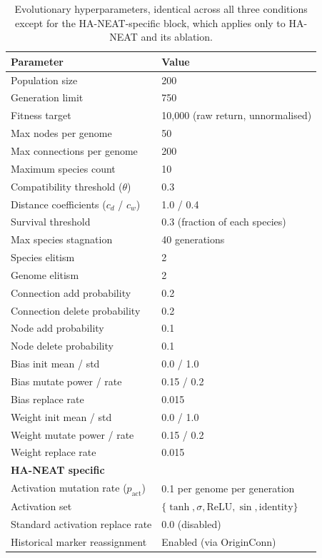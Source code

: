 \documentclass[12pt]{article}
\newcommand{\revTerm}[2]{#2}
\newcommand{\revFig}[2]{#2}
\begin{document}
\begin{table}[h]
\centering
\caption{\revFig{F-06b}{Evolutionary hyperparameters, identical across all three conditions except for the HA-NEAT-specific block, which applies only to HA-NEAT and its ablation.}}
\label{tab:hyperparameters}
\begin{tabular}{ll}
\toprule
\textbf{Parameter} & \textbf{Value} \\
\midrule
Population size & 200 \\
Generation limit & 750 \\
\revFig{F-07}{Fitness target} & 10{,}000 (raw return, unnormalised) \\
Max nodes per genome & 50 \\
Max connections per genome & 200 \\
Maximum species count & 10 \\
Compatibility threshold ($\theta$) & 0.3 \\
Distance coefficients ($c_d$ / $c_w$) & 1.0 / 0.4 \\
Survival threshold & 0.3 (fraction of each species) \\
Max species stagnation & 40 generations \\
Species elitism & 2 \\
Genome elitism & 2 \\
Connection add probability & 0.2 \\
Connection delete probability & 0.2 \\
Node add probability & 0.1 \\
Node delete probability & 0.1 \\
Bias init mean / std & 0.0 / 1.0 \\
Bias mutate power / rate & 0.15 / 0.2 \\
Bias replace rate & 0.015 \\
Weight init mean / std & 0.0 / 1.0 \\
Weight mutate power / rate & 0.15 / 0.2 \\
Weight replace rate & 0.015 \\
\midrule
\textbf{HA-NEAT specific} & \\
Activation mutation rate ($p_{\text{act}}$) & 0.1 per genome per generation \\
\revTerm{T-09}{Activation set} & $\{\tanh, \sigma, \text{ReLU}, \sin, \text{identity}\}$ \\
Standard activation replace rate & 0.0 (disabled) \\
Historical marker reassignment & Enabled (via OriginConn) \\
\bottomrule
\end{tabular}
\end{table}
\end{document}
